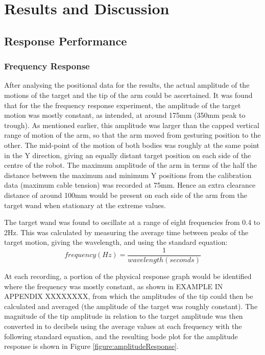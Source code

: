 \documentclass[11pt]{article}
\begin{document}
\section{Results and Discussion}
\subsection{Response Performance}
\subsubsection{Frequency Response}

After analysing the positional data for the results, the actual amplitude of the motions of the target and the tip of the arm could be ascertained. It was found that for the the frequency response experiment, the amplitude of the target motion was mostly constant, as intended, at around 175mm (350mm peak to trough). As mentioned earlier, this amplitude was larger than the capped vertical range of motion of the arm, so that the arm moved from gesturing position to the other. The mid-point of the motion of both bodies was roughly at the same point in the Y direction, giving an equally distant target position on each side of the centre of the robot. The maximum amplitude of the arm in terms of the half the distance between the maximum and minimum Y positions from the calibration data (maximum cable tension) was recorded at 75mm. Hence an extra clearance distance of around 100mm would be present on each side of the arm from the target wand when stationary at the extreme values. 

The target wand was found to oscillate at a range of eight frequencies from 0.4 to 2Hz. This was calculated by measuring the average time between peaks of the target motion, giving the wavelength, and using the standard equation:
\begin{equation}
frequency(Hz) = \frac{1}{wavelength(seconds)}
\end{equation}

At each recording, a portion of the physical response graph would be identified where the frequency was mostly constant, as shown in EXAMPLE IN APPENDIX XXXXXXXX, from which the amplitudes of the tip could then be calculated and averaged (the amplitude of the target was roughly constant). The magnitude of the tip amplitude in relation to the target amplitude was then converted in to decibels using the average values at each frequency with the following standard equation, and the resulting bode plot for the amplitude response is shown in Figure \ref{figure:amplitudeResponse}.
\end{document}
